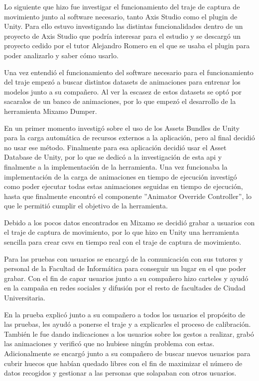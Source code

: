 Lo siguiente que hizo fue investigar el funcionamiento del traje de captura de movimiento junto al software necesario, tanto Axis Studio como el plugin de Unity.
Para ello estuvo investigando las distintas funcionalidades dentro de un proyecto de Axis Studio que podría interesar para el estudio y se descargó un proyecto cedido por el tutor Alejandro Romero en el que se usaba el plugin para poder analizarlo y saber cómo usarlo.

Una vez entendió el funcionamiento del software necesario para el funcionamiento del traje empezó a buscar distintos datasets de animaciones para entrenar los modelos junto a su compañero.
Al ver la escasez de estos datasets se optó por sacaralos de un banco de animaciones, por lo que empezó el desarrollo de la herramienta Mixamo Dumper.

En un primer momento investigó sobre el uso de los Assets Bundles de Unity para la carga automática de recursos externos a la aplicación, pero al final decidió no usar ese método.
Finalmente para esa aplicación decidió usar el Asset Database de Unity, por lo que se dedicó a la investigación de esta \gls{api} y finalmente a la implementación de la herramienta.
Una vez funcionaba la implementación de la carga de animaciones en tiempo de ejecución investigó como poder ejecutar todas estas animaciones seguidas en tiempo de ejecución, hasta que finalmente encontró el componente ''Animator Override Controller'', lo que le permitió cumplir el objetivo de la herramienta.

Debido a los pocos datos encontrados en Mixamo se decidió grabar a usuarios con el traje de captura de movimiento, por lo que hizo en Unity una herramienta sencilla para crear \glspl{csv} en tiempo real con el traje de captura de movimiento.

Para las pruebas con usuarios se encargó de la comunicación con sus tutores y personal de la Facultad de Informática para conseguir un lugar en el que poder grabar.
Con el fin de capar usuarios junto a su compañero hizo carteles y ayudó en la campaña en redes sociales y difusión por el resto de facultades de Ciudad Universitaria.

En la prueba explicó junto a su compañero a todos los usuarios el propósito de las pruebas, les ayudó a ponerse el traje y a explicarles el proceso de calibración. 
También le fue dando indicaciones a los usuarios sobre los gestos a realizar, grabó las animaciones y verificó que no hubiese ningún problema con estas.
Adicionalmente se encargó junto a su compañero de buscar nuevos usuarios para cubrir huecos que habían quedado libres con el fin de maximizar el número de datos recogidos y gestionar a las personas que solapaban con otros usuarios.

